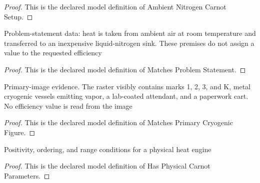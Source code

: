 \begin{proof}
  This is the declared model definition of Ambient Nitrogen Carnot Setup.
\end{proof}
\begin{definition}
  \label{def:physics:phyx-mini-0493:phyxminiproblems-problemphyxmini0493-matchesproblemstatement}
  Problem-statement data: heat is taken from ambient air at room temperature and transferred to an inexpensive liquid-nitrogen sink. These premises do not assign a value to the requested efficiency
\end{definition}
\begin{proof}
  This is the declared model definition of Matches Problem Statement.
\end{proof}
\begin{definition}
  \label{def:physics:phyx-mini-0493:phyxminiproblems-problemphyxmini0493-matchesprimarycryogenicfigure}
  Primary-image evidence. The raster visibly contains marks 1, 2, 3, and K, metal cryogenic vessels emitting vapor, a lab-coated attendant, and a paperwork cart. No efficiency value is read from the image
\end{definition}
\begin{proof}
  This is the declared model definition of Matches Primary Cryogenic Figure.
\end{proof}
\begin{definition}
  \label{def:physics:phyx-mini-0493:phyxminiproblems-problemphyxmini0493-hasphysicalcarnotparameters}
  Positivity, ordering, and range conditions for a physical heat engine
\end{definition}
\begin{proof}
  This is the declared model definition of Has Physical Carnot Parameters.
\end{proof}
